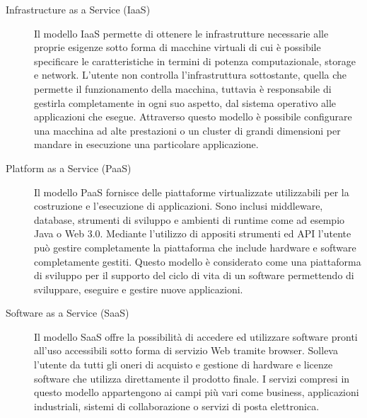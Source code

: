 \begin{description}
    \item[Infrastructure as a Service (IaaS)]Il modello IaaS permette di ottenere le infrastrutture necessarie alle proprie esigenze sotto forma di macchine virtuali di cui è possibile specificare le caratteristiche in termini di potenza computazionale, storage e network. L’utente non controlla l’infrastruttura sottostante, quella che permette il funzionamento della macchina, tuttavia è responsabile di gestirla completamente in ogni suo aspetto, dal sistema operativo alle applicazioni che esegue. Attraverso questo modello è possibile configurare una macchina ad alte prestazioni o un cluster di grandi dimensioni per mandare in esecuzione una particolare applicazione.
    
    \item[Platform as a Service (PaaS)] Il modello PaaS fornisce delle piattaforme virtualizzate utilizzabili per la costruzione e l’esecuzione di applicazioni. Sono inclusi middleware, database, strumenti di sviluppo e ambienti di runtime come ad esempio Java o Web 3.0. Mediante l’utilizzo di appositi strumenti ed API l’utente può gestire completamente la piattaforma che include hardware e software completamente gestiti. Questo modello è considerato come una piattaforma di sviluppo per il supporto del ciclo di vita di un software permettendo di sviluppare, eseguire e gestire nuove applicazioni.

    \item[Software as a Service (SaaS)] Il modello SaaS offre la possibilità di accedere ed utilizzare software pronti all’uso accessibili sotto forma di servizio Web tramite browser. Solleva l’utente da tutti gli oneri di acquisto e gestione di hardware e licenze software che utilizza direttamente il prodotto finale. I servizi compresi in questo modello appartengono ai campi più vari come business, applicazioni industriali, sistemi di collaborazione o servizi di posta elettronica.

\end{description}

